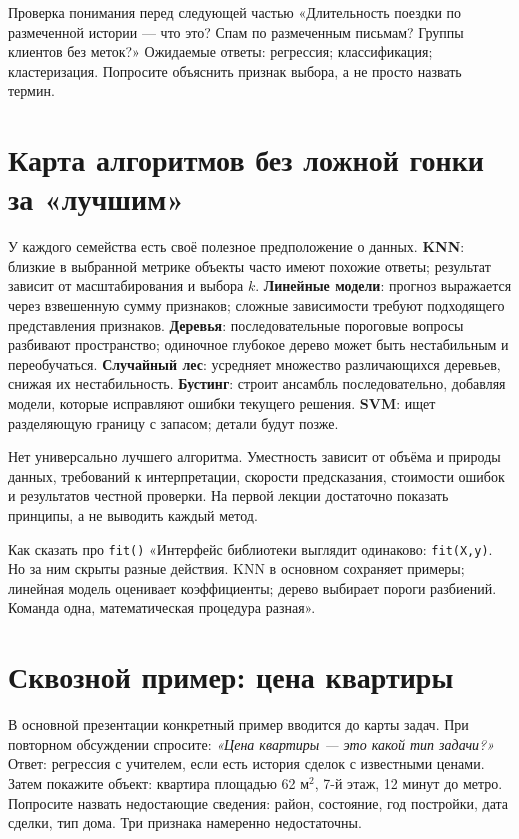 \documentclass[11pt,a4paper]{article}
\newcommand{\term}[1]{\textbf{\color{navy}#1}}
\begin{document}
\begin{saybox}{Проверка понимания перед следующей частью}
«Длительность поездки по размеченной истории --- что это? Спам по размеченным письмам? Группы клиентов без меток?» Ожидаемые ответы: регрессия; классификация; кластеризация. Попросите объяснить признак выбора, а не просто назвать термин.
\end{saybox}

\section{Карта алгоритмов без ложной гонки за «лучшим»}



У каждого семейства есть своё полезное предположение о данных. \term{KNN}: близкие в выбранной метрике объекты часто имеют похожие ответы; результат зависит от масштабирования и выбора $k$. \term{Линейные модели}: прогноз выражается через взвешенную сумму признаков; сложные зависимости требуют подходящего представления признаков. \term{Деревья}: последовательные пороговые вопросы разбивают пространство; одиночное глубокое дерево может быть нестабильным и переобучаться. \term{Случайный лес}: усредняет множество различающихся деревьев, снижая их нестабильность. \term{Бустинг}: строит ансамбль последовательно, добавляя модели, которые исправляют ошибки текущего решения. \term{SVM}: ищет разделяющую границу с запасом; детали будут позже.

Нет универсально лучшего алгоритма. Уместность зависит от объёма и природы данных, требований к интерпретации, скорости предсказания, стоимости ошибок и результатов честной проверки. На первой лекции достаточно показать принципы, а не выводить каждый метод.

\begin{saybox}{Как сказать про \texttt{fit()}}
«Интерфейс библиотеки выглядит одинаково: \texttt{fit(X,y)}. Но за ним скрыты разные действия. KNN в основном сохраняет примеры; линейная модель оценивает коэффициенты; дерево выбирает пороги разбиений. Команда одна, математическая процедура разная».
\end{saybox}

\section{Сквозной пример: цена квартиры}



В основной презентации конкретный пример вводится до карты задач. При повторном обсуждении спросите: \emph{«Цена квартиры --- это какой тип задачи?»} Ответ: регрессия с учителем, если есть история сделок с известными ценами. Затем покажите объект: квартира площадью 62 м$^2$, 7-й этаж, 12 минут до метро. Попросите назвать недостающие сведения: район, состояние, год постройки, дата сделки, тип дома. Три признака намеренно недостаточны.
\end{document}
